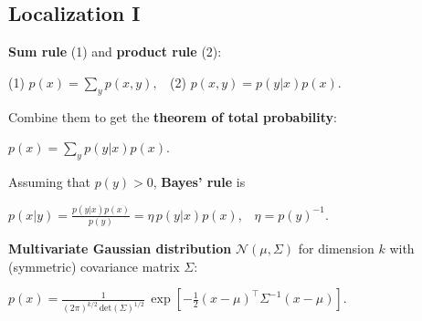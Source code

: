\documentclass[landscape]{article}
\newcommand{\vmspace}{\vspace{-7pt}}
\newcommand{\vpspace}{\vspace{5pt}}
\begin{document}
\begin{multicols}{3}



\vfill


\section{Localization I}

\vmspace


\begin{minipage}{\columnwidth}
  \textbf{Sum rule} (1) and \textbf{product rule} (2):
  \vmspace
  \begin{center}
    (1) $p(x) = \sum_y p(x,y),\;\;$
    (2) $p(x, y) = p(y | x) p(x)$.
  \end{center}
\end{minipage}

\vpspace

\begin{minipage}{\columnwidth}
  Combine them to get the \textbf{theorem of total probability}:
  \vmspace
  \begin{center}
    $p(x) = \sum_y p(y | x) p(x).$
  \end{center}
\end{minipage}

\vpspace

\begin{minipage}{\columnwidth}
  Assuming that $p(y) > 0$, \textbf{Bayes' rule} is
  \vmspace
  \begin{center}
    $p(x|y) = \frac{p(y|x)p(x)}{p(y)} = \eta\, p(y|x)p(x),\;\;\;
    \eta = p(y)^{-1}.$
  \end{center}
\end{minipage}

\vpspace

\begin{minipage}{\columnwidth}
  \textbf{Multivariate Gaussian distribution} $\mathcal N(\mu, \Sigma)$ for
  dimension $k$ with (symmetric) covariance matrix $\Sigma$:
  \vmspace
  \begin{center}
    $
    p(x)
    =
    \frac{1}{(2\pi)^{k/2}\,\mathrm{det}(\Sigma)^{1/2}}\,
    \exp\left[
    -\frac{1}{2}(x-\mu)^\intercal \Sigma^{-1} (x-\mu)
    \right].
    $
  \end{center}
\end{minipage}


\end{multicols}
\end{document}
